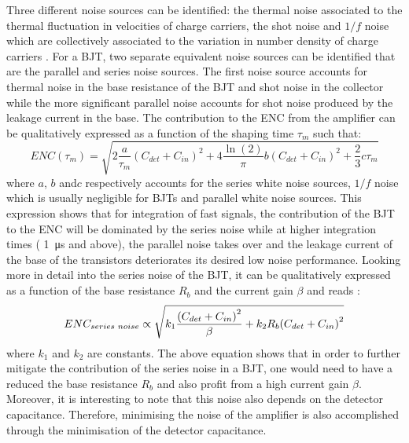 		Three different noise sources can be identified: the thermal noise associated to the thermal fluctuation in velocities of charge carriers, the shot noise and $1/f$ noise which are collectively associated to the variation in number density of charge carriers \cite{detectors}.
		For a BJT, two separate equivalent noise sources can be identified that are the parallel and series noise sources. The first noise source accounts for thermal noise in the base resistance of the BJT and shot noise in the collector while the more significant parallel noise accounts for shot noise produced by the leakage current in the base. The contribution to the ENC from the amplifier can be qualitatively expressed as a function of the shaping time $\tau_m$ such that:    
		\begin{equation}
  			ENC(\tau_m) = \sqrt{2 \frac{a}{\tau_m} {\left( C_{det} + C_{in} \right)}^2 + 4 \frac{\ln(2)}{\pi} b{\left( C_{det} + C_{in} \right)}^2 + \frac{2}{3}c \tau_m} 
		\end{equation}
		where $a$, $b$ and$c$ respectively accounts for the series white noise sources, $1/f$ noise which is usually negligible for BJTs \cite{Paolozzi_thesis} and parallel white noise sources. This expression shows that for integration of fast signals, the contribution of the BJT to the ENC will be dominated by the series noise while at higher integration times ( \SI{1}{\micro\second} and above), the parallel noise takes over and the leakage current of the base of the transistors deteriorates its desired low noise performance. Looking more in detail into the series noise of the BJT, it can be qualitatively expressed as a function of the base resistance $R_b$ and the current gain $\beta$ and reads \cite{Paolozzi_thesis}: 
		\begin{equation}
  			ENC_{series \hspace{1mm} noise} \propto \sqrt{k_1 \frac{{\left( C_{det} + C_{in} \right)}^2}{\beta} + k_2 R_b {\left( C_{det} + C_{in} \right)}^2}
  			\label{eq:ENC_series}
		\end{equation}
		where $k_1$ and $k_2$ are constants. The above equation shows that in order to further mitigate the contribution of the series noise in a BJT, one would need to have a reduced the base resistance $R_b$ and also profit from a high current gain $\beta$. Moreover, it is interesting to note that this noise also depends on the detector capacitance. Therefore, minimising the noise of the amplifier is also accomplished through the minimisation of the detector capacitance.

